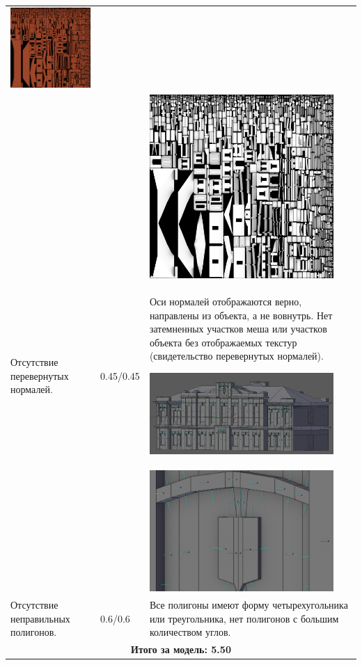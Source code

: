 \begin{longtable}{|p{4cm}|p{2.5cm}|p{7.5cm}|}
    \includegraphics[width=7cm]{src/tec_15}\\
    & & \includegraphics[width=7cm]{src/tec_16}\\
  
    \hline
    Отсутствие перевернутых нормалей. & 0.45/0.45 & Оси нормалей отображаются верно, направлены из объекта, а не вовнутрь. Нет затемненных участков меша или участков объекта без отображаемых текстур (свидетельство перевернутых нормалей).

    \includegraphics[width=7cm]{src/norm_15}\\
    & & \includegraphics[width=7cm]{src/norm_16}\\
    \hline
    Отсутствие неправильных полигонов. & 0.6/0.6 & Все полигоны имеют форму четырехугольника или треугольника, нет полигонов с большим количеством углов. \\
    \hline
    \multicolumn{3}{|c|}{\textbf{Итого за модель: 5.50}} \\
    \hline
\end{longtable}


